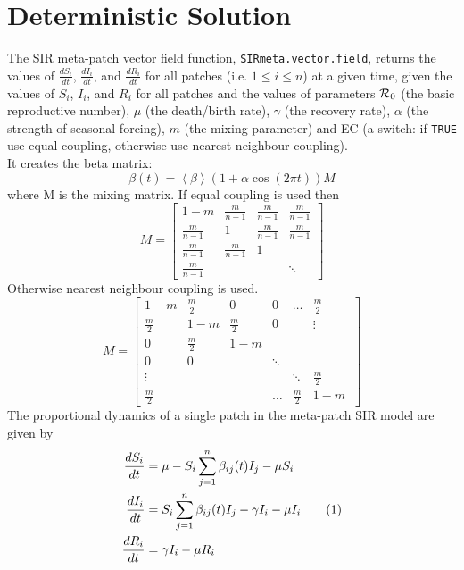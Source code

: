 \documentclass{article}\usepackage[]{graphicx}\usepackage[]{color}
\newcommand\numberthis{\addtocounter{equation}{1}\tag{\theequation}}
\begin{document}
\section{Deterministic Solution}
The SIR meta-patch vector field function, \verb|SIRmeta.vector.field|, returns the values of $\frac{dS_i}{dt}$, $\frac{dI_i}{dt}$, and $\frac{dR_i}{dt}$ for all patches (i.e. $1 \leq i \leq n$) at a given time, given the values of $S_i$, $I_i$, and $R_i$ for all patches and the values of parameters ${\cal R}_0$ (the basic reproductive number), $\mu$ (the death/birth rate), $\gamma$ (the recovery rate), $\alpha$ (the strength of seasonal forcing), $m$ (the mixing parameter) and EC (a switch: if {\color{magenta}\verb|TRUE|} use equal coupling, otherwise use nearest neighbour coupling). \\
It creates the beta matrix:
\begin{equation}
  \beta(t) = \left < \beta \right > (1+\alpha \cos(2\pi t))M
\end{equation}
where M is the mixing matrix. If equal coupling is used then 
\[
M =
\begin{bmatrix}
  1-m & \frac{m}{n-1} & \frac{m}{n-1} & \frac{m}{n-1} \\
  \frac{m}{n-1} & 1 & \frac{m}{n-1} & \frac{m}{n-1}  \\
  \frac{m}{n-1} & \frac{m}{n-1} & 1 &  \\
  \frac{m}{n-1} &  &  & \ddots 
\end{bmatrix}
\]
Otherwise nearest neighbour coupling is used.
\[
M =
\begin{bmatrix}
  1-m & \frac{m}{2} & 0 & 0 & \dots & \frac{m}{2} \\
  \frac{m}{2} & 1-m & \frac{m}{2} & 0 & & \vdots \\
  0 & \frac{m}{2} & 1-m &  \\
  0 & 0 & & \ddots \\
  \vdots & & & & \ddots & \frac{m}{2} \\
  \frac{m}{2} &  & & \dots & \frac{m}{2} & 1-m \ 
\end{bmatrix}
\]
The proportional dynamics of a single patch in the meta-patch SIR model are given by
\begin{align*}
  \frac{dS_i}{dt} &= \mu  - S_i\sum\limits_{j=1}^{n}\beta_{ij}(t) I_j -\mu S_i \\ 
  \frac{dI_i}{dt} &= S_i\sum\limits_{j=1}^{n}\beta_{ij}(t) I_j -\gamma I_i - \mu I_i \numberthis \label{model} \\
  \frac{dR_i}{dt} &= \gamma I_i -\mu R_i      
\end{align*}
\end{document}
